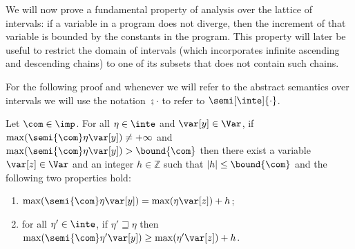 
We will now prove a fundamental property of analysis over the lattice
of intervals: if a variable in a program does not diverge, then the
increment of that variable is bounded by the constants in the
program. This property will later be useful to restrict the domain of
intervals (which incorporates infinite ascending and descending
chains) to one of its subsets that does not contain such chains.

\begin{notation}
  For the following proof and whenever we will refer to the abstract
  semantics over intervals we will use the notation \(\semi{\cdot}\)
  to refer to \(\semi[\inte]{\cdot}\).
\end{notation}

\begin{lemma}\label{le:inc}
  Let \(\com\in \imp\).
  For all \(\eta \in \inte\) and \(\var[y] \in \Var\), if
  \(\max(\semi{\com} \eta \var[y]) \neq +\infty\) and
  \(\max(\semi{\com}\eta \var[y]) > \bound{\com}\) then there exist a
  variable \(\var[z] \in \Var\) and an integer \(h \in \mathbb{Z}\)
  such that \(|h| \leq \bound{\com}\) and the following two properties
  hold:
  \begin{enumerate}[label=(\roman*)]
  \item\label{point1} \(\max(\semi{\com}\eta \var[y]) = \max(\eta \var[z]) + h\); 
  \item\label{point2} for all \(\eta' \in \inte\), if \(\eta' \sqsupseteq \eta\)
    then
    \(\max(\semi{\com}\eta' \var[y]) \geq \max(\eta' \var[z]) + h\).
  \end{enumerate}
\end{lemma}

